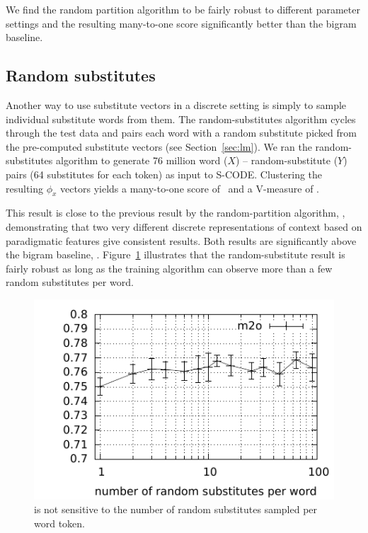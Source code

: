 We find the random partition algorithm to be fairly robust to different
parameter settings and the resulting many-to-one score significantly
better than the bigram baseline.

\subsection{Random substitutes}\label{sec:wordsub}

Another way to use substitute vectors in a discrete setting is simply
to sample individual substitute words from them.  The
random-substitutes algorithm cycles through the test data and pairs
each word with a random substitute picked from the pre-computed
substitute vectors (see Section~\ref{sec:lm}).  We ran the
random-substitutes algorithm to generate 76 million word ($X$) --
random-substitute ($Y$) pairs (64 substitutes for each token) as input
to S-CODE.  Clustering the resulting $\phi_x$ vectors yields a
many-to-one score of \wsmto\ and a V-measure of \wsvm.

This result is close to the previous result by the random-partition
algorithm, \rpmto, demonstrating that two very different discrete
representations of context based on paradigmatic features give
consistent results.  Both results are significantly above the bigram
baseline, \bgmto.  Figure~\ref{plot-s} illustrates that the
random-substitute result is fairly robust as long as the training
algorithm can observe more than a few random substitutes per word.

\begin{figure}[ht] \centering
\includegraphics[width=\linewidth]{plot-s.pdf}
\caption{\mto is not sensitive to the number of random substitutes
  sampled per word token.}
\label{plot-s}
\end{figure}
